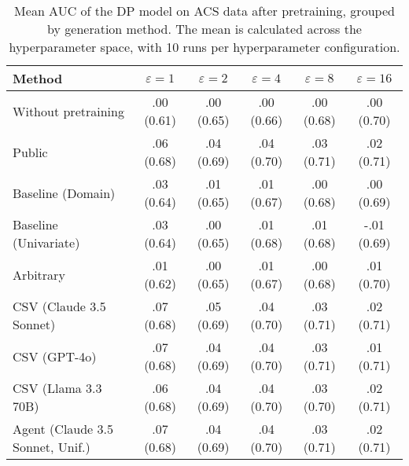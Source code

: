 \begin{table}[h!]
    \centering
    \caption{Mean AUC of the DP model on ACS data after pretraining, grouped by generation method. The mean is calculated across the hyperparameter space, with 10 runs per hyperparameter configuration.}
    \label{tab:epsilon_comparison}
    \begin{tabular}{lccccc}
    \toprule
    Method & $\varepsilon=1$ & $\varepsilon=2$ & $\varepsilon=4$ & $\varepsilon=8$ & $\varepsilon=16$ \\
    \midrule
    Without pretraining & .00 {\small (0.61)} & .00 {\small (0.65)} & .00 {\small (0.66)} & .00 {\small (0.68)} & .00 {\small (0.70)} \\
    \arrayrulecolor{black!50!}\midrule
    Public & .06 {\small (0.68)} & .04 {\small (0.69)} & .04 {\small (0.70)} & .03 {\small (0.71)} & \cellcolor{gold!30}.02 {\small (0.71)} \\
    \arrayrulecolor{black!50!}\midrule
    Baseline (Domain) & .03 {\small (0.64)} & .01 {\small (0.65)} & .01 {\small (0.67)} & .00 {\small (0.68)} & .00 {\small (0.69)} \\
    Baseline (Univariate) & .03 {\small (0.64)} & .00 {\small (0.65)} & .01 {\small (0.68)} & .01 {\small (0.68)} & -.01 {\small (0.69)} \\
    \arrayrulecolor{black!50!}\midrule
    Arbitrary & .01 {\small (0.62)} & .00 {\small (0.65)} & .01 {\small (0.67)} & .00 {\small (0.68)} & .01 {\small (0.70)} \\
    \arrayrulecolor{black!50!}\midrule
    CSV (Claude 3.5 Sonnet) & \cellcolor{silver!30}.07 {\small (0.68)} & \cellcolor{gold!30}.05 {\small (0.69)} & \cellcolor{silver!30}.04 {\small (0.70)} & \cellcolor{gold!30}.03 {\small (0.71)} & \cellcolor{silver!30}.02 {\small (0.71)} \\
    CSV (GPT-4o) & \cellcolor{gold!30}.07 {\small (0.68)} & \cellcolor{silver!30}.04 {\small (0.69)} & \cellcolor{gold!30}.04 {\small (0.70)} & \cellcolor{silver!30}.03 {\small (0.71)} & \cellcolor{bronze!30}.01 {\small (0.71)} \\
    CSV (Llama 3.3 70B) & .06 {\small (0.68)} & \cellcolor{bronze!30}.04 {\small (0.69)} & \cellcolor{bronze!30}.04 {\small (0.70)} & .03 {\small (0.70)} & \cellcolor{gold!30}.02 {\small (0.71)} \\
    \arrayrulecolor{black!50!}\midrule
    Agent (Claude 3.5 Sonnet, Unif.) & \cellcolor{silver!30}.07 {\small (0.68)} & \cellcolor{silver!30}.04 {\small (0.69)} & \cellcolor{silver!30}.04 {\small (0.70)} & \cellcolor{bronze!30}.03 {\small (0.71)} & \cellcolor{silver!30}.02 {\small (0.71)} \\

\end{tabular}
\end{table}
